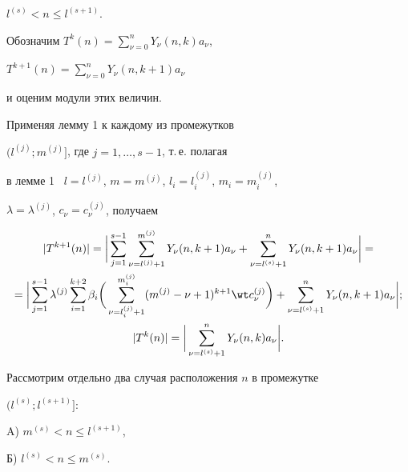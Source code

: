 $l^{(s)}<n \le l^{(s+1)}$.


Обозначим $T^k (n)=\sum\limits_{\nu=0}^n Y_{\nu} (n, k) a_{\nu}$, 


$T^{k+1} (n)=\sum\limits_{\nu=0}^n Y_{\nu} (n, k+1) a_{\nu}$


и оценим модули этих величин.





Применяя лемму 1 к каждому из промежутков


$(l^{(j)};m^{(j)}]$, где $j=1,\dotsc,s-1$, т.\,е. полагая


в лемме 1 \ $l=l^{(j)}$, $m=m^{(j)}$, $l_i=l_i^{(j)}$, $m_i=m_i^{(j)}$, 


$\lambda=\lambda^{(j)}$, $c_{\nu}=c_{\nu}^{(j)}$, получаем


\begin{gather}


|T^{k+1} (n)|=\bigg| \sum_{j=1}^{s-1} 


\sum_{\nu=l^{(j)}+1}^{m^{(j)}} Y_{\nu} (n, k+1) a_{\nu}+


\sum_{\nu=l^{(s)}+1}^n Y_{\nu} (n, k+1) a_{\nu} \bigg|=\notag \\


%


=\bigg| \sum_{j=1}^{s-1} \lambda^{(j)} \sum_{i=1}^{k+2} \beta_i 


\bigg(\sum_{\nu=l_i^{(j)}+1}^{m_i^{(j)}} (m^{(j)}-\nu+1)^{k+1} 


\wt c{}_{\nu}^{(j)}\bigg)+


\sum_{\nu=l^{(s)}+1}^n Y_{\nu} (n, k+1) a_{\nu} \bigg|;\notag\\


%


|T^k (n)|=\bigg|\sum_{\nu=l^{(s)}+1}^n Y_{\nu} (n, k) a_{\nu} \bigg|.


\end{gather}





Рассмотрим отдельно два случая расположения $n$ в промежутке 


$(l^{(s)}; l^{(s+1)}]$:





A) $m^{(s)}<n \le l^{(s+1)}$,





Б) $l^{(s)}<n \le m^{(s)}$.





